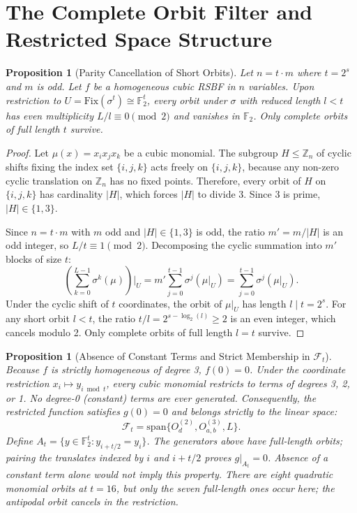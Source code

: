 \documentclass[11pt,a4paper]{article}
\newtheorem{proposition}[theorem]{Proposition}
\theoremstyle{definition}
\newcommand{\F}{\mathbb{F}_2}
\begin{document}
\section{The Complete Orbit Filter and Restricted Space Structure}

\begin{proposition}[Parity Cancellation of Short Orbits]
Let $n = t \cdot m$ where $t = 2^s$ and $m$ is odd. Let $f$ be a homogeneous cubic RSBF in $n$ variables. Upon restriction to $U = \mathrm{Fix}(\sigma^t) \cong \F^t$, every orbit under $\sigma$ with reduced length $l < t$ has even multiplicity $L/l \equiv 0 \pmod 2$ and vanishes in $\F$. Only complete orbits of full length $t$ survive.
\end{proposition}

\begin{proof}
Let $\mu(x) = x_i x_j x_k$ be a cubic monomial. The subgroup $H \le \mathbb{Z}_n$ of cyclic shifts fixing the index set $\{i, j, k\}$ acts freely on $\{i, j, k\}$, because any non-zero cyclic translation on $\mathbb{Z}_n$ has no fixed points. Therefore, every orbit of $H$ on $\{i, j, k\}$ has cardinality $|H|$, which forces $|H|$ to divide 3. Since 3 is prime, $|H| \in \{1, 3\}$.

Since $n = t \cdot m$ with $m$ odd and $|H| \in \{1, 3\}$ is odd, the ratio $m' = m / |H|$ is an odd integer, so $L/t \equiv 1 \pmod 2$.
Decomposing the cyclic summation into $m'$ blocks of size $t$:
\begin{equation}
\left( \sum_{k=0}^{L-1} \sigma^k(\mu) \right) \Bigg|_U = m' \sum_{j=0}^{t-1} \sigma^j(\mu|_U) = \sum_{j=0}^{t-1} \sigma^j(\mu|_U).
\end{equation}
Under the cyclic shift of $t$ coordinates, the orbit of $\mu|_U$ has length $l \mid t = 2^s$. For any short orbit $l < t$, the ratio $t/l = 2^{s - \log_2(l)} \ge 2$ is an even integer, which cancels modulo 2. Only complete orbits of full length $l = t$ survive.
\end{proof}

\begin{proposition}[Absence of Constant Terms and Strict Membership in $\mathcal{F}_t$]
Because $f$ is strictly homogeneous of degree 3, $f(0) = 0$. Under the coordinate restriction $x_i \mapsto y_{i \bmod t}$, every cubic monomial restricts to terms of degrees 3, 2, or 1. No degree-0 (constant) terms are ever generated. Consequently, the restricted function satisfies $g(0) = 0$ and belongs strictly to the linear space:
\begin{equation}
\mathcal{F}_t = \mathrm{span}\{O^{(2)}_d, O^{(3)}_{a,b}, L\}.
\end{equation}
Define $A_t=\{y\in\F^t:y_{i+t/2}=y_i\}$. The generators above have full-length orbits; pairing the translates indexed by $i$ and $i+t/2$ proves $g|_{A_t}=0$. Absence of a constant term alone would not imply this property. There are eight quadratic monomial orbits at $t=16$, but only the seven full-length ones occur here; the antipodal orbit cancels in the restriction.
\end{proposition}
\end{document}
